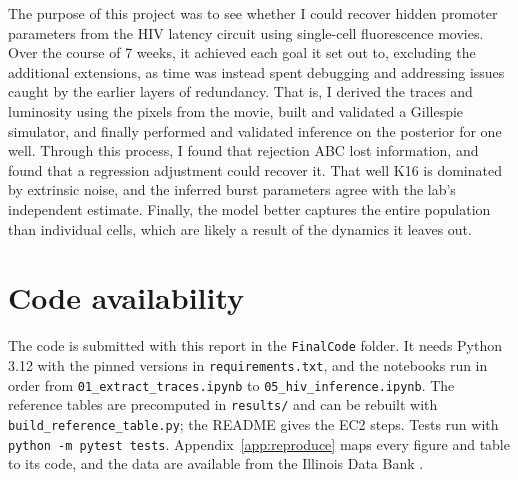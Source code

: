 The purpose of this project was to see whether I could recover hidden promoter parameters from the HIV latency circuit using single-cell fluorescence movies. Over the course of 7 weeks, it achieved each goal it set out to, excluding the additional extensions, as time was instead spent debugging and addressing issues caught by the earlier layers of redundancy. That is, I derived the traces and luminosity using the pixels from the movie, built and validated a Gillespie simulator, and finally performed and validated inference on the posterior for one well. Through this process, I found that rejection ABC lost information, and found that a regression adjustment could recover it. That well K16 is dominated by extrinsic noise, and the inferred burst parameters agree with the lab's independent estimate. Finally, the model better captures the entire population than individual cells, which are likely a result of the dynamics it leaves out.

\section*{Code availability}\label{sec:code-availability}

The code is submitted with this report in the \texttt{FinalCode} folder. It needs Python 3.12 with the pinned versions in \texttt{requirements.txt}, and the notebooks run in order from \texttt{01\_extract\_traces.ipynb} to \texttt{05\_hiv\_inference.ipynb}. The reference tables are precomputed in \texttt{results/} and can be rebuilt with \texttt{build\_reference\_table.py}; the README gives the EC2 steps. Tests run with \texttt{python -m pytest tests}. Appendix~\ref{app:reproduce} maps every figure and table to its code, and the data are available from the Illinois Data Bank \cite{idb_dataset}.
